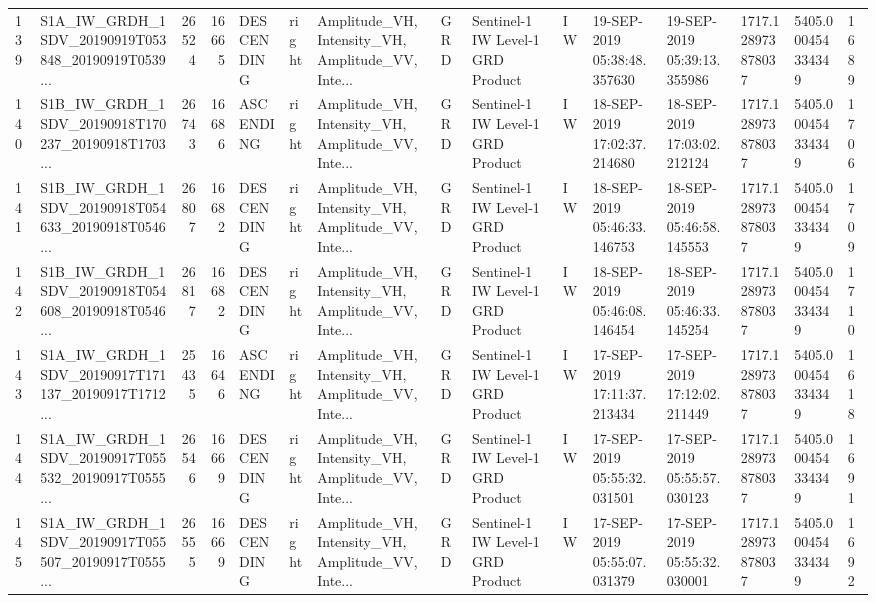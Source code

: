 \begin{tabular}{llrrlllllllllll}
139 &  S1A\_IW\_GRDH\_1SDV\_20190919T053848\_20190919T0539... &  26524 &   16665 &  DESCENDING &  right &  Amplitude\_VH, Intensity\_VH, Amplitude\_VV, Inte... &          GRD &  Sentinel-1 IW Level-1 GRD Product &              IW &  19-SEP-2019 05:38:48.357630 &  19-SEP-2019 05:39:13.355986 &          1717.128973878037 &  5405.000454334349 &       1689 \\
140 &  S1B\_IW\_GRDH\_1SDV\_20190918T170237\_20190918T1703... &  26743 &   16686 &   ASCENDING &  right &  Amplitude\_VH, Intensity\_VH, Amplitude\_VV, Inte... &          GRD &  Sentinel-1 IW Level-1 GRD Product &              IW &  18-SEP-2019 17:02:37.214680 &  18-SEP-2019 17:03:02.212124 &          1717.128973878037 &  5405.000454334349 &       1706 \\
141 &  S1B\_IW\_GRDH\_1SDV\_20190918T054633\_20190918T0546... &  26807 &   16682 &  DESCENDING &  right &  Amplitude\_VH, Intensity\_VH, Amplitude\_VV, Inte... &          GRD &  Sentinel-1 IW Level-1 GRD Product &              IW &  18-SEP-2019 05:46:33.146753 &  18-SEP-2019 05:46:58.145553 &          1717.128973878037 &  5405.000454334349 &       1709 \\
142 &  S1B\_IW\_GRDH\_1SDV\_20190918T054608\_20190918T0546... &  26817 &   16682 &  DESCENDING &  right &  Amplitude\_VH, Intensity\_VH, Amplitude\_VV, Inte... &          GRD &  Sentinel-1 IW Level-1 GRD Product &              IW &  18-SEP-2019 05:46:08.146454 &  18-SEP-2019 05:46:33.145254 &          1717.128973878037 &  5405.000454334349 &       1710 \\
143 &  S1A\_IW\_GRDH\_1SDV\_20190917T171137\_20190917T1712... &  25435 &   16646 &   ASCENDING &  right &  Amplitude\_VH, Intensity\_VH, Amplitude\_VV, Inte... &          GRD &  Sentinel-1 IW Level-1 GRD Product &              IW &  17-SEP-2019 17:11:37.213434 &  17-SEP-2019 17:12:02.211449 &          1717.128973878037 &  5405.000454334349 &       1618 \\
144 &  S1A\_IW\_GRDH\_1SDV\_20190917T055532\_20190917T0555... &  26546 &   16669 &  DESCENDING &  right &  Amplitude\_VH, Intensity\_VH, Amplitude\_VV, Inte... &          GRD &  Sentinel-1 IW Level-1 GRD Product &              IW &  17-SEP-2019 05:55:32.031501 &  17-SEP-2019 05:55:57.030123 &          1717.128973878037 &  5405.000454334349 &       1691 \\
145 &  S1A\_IW\_GRDH\_1SDV\_20190917T055507\_20190917T0555... &  26555 &   16669 &  DESCENDING &  right &  Amplitude\_VH, Intensity\_VH, Amplitude\_VV, Inte... &          GRD &  Sentinel-1 IW Level-1 GRD Product &              IW &  17-SEP-2019 05:55:07.031379 &  17-SEP-2019 05:55:32.030001 &          1717.128973878037 &  5405.000454334349 &       1692 \\

\end{tabular}
